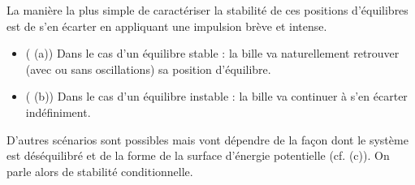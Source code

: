 La manière la plus simple de caractériser la stabilité de ces positions 
d'équilibres est de s'en écarter en appliquant une impulsion brève et intense. 
\begin{itemize}
    \item ( (a)) Dans le cas d'un équilibre stable : 
        la bille va naturellement retrouver (avec ou sans oscillations) 
        sa position d'équilibre. 
    \item ( (b)) Dans le cas d'un équilibre instable :
        la bille va continuer à s'en écarter indéfiniment. 
\end{itemize}
D'autres scénarios sont possibles mais vont dépendre de la façon dont le 
système est déséquilibré et de la forme de la surface d'énergie potentielle 
(cf.  (c)). On parle alors de stabilité conditionnelle.

